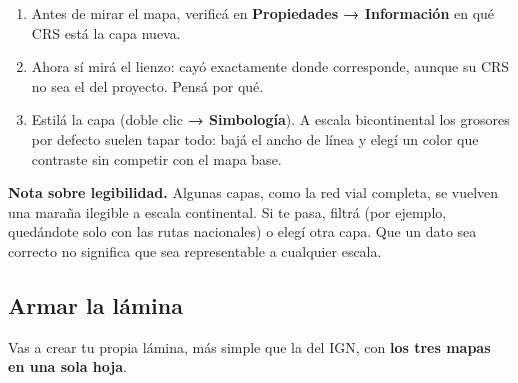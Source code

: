\documentclass{article}
\begin{document}
\begin{enumerate}
    \item Antes de mirar el mapa, verificá en \textbf{Propiedades → Información} en qué CRS está la capa nueva.
    \item Ahora sí mirá el lienzo: cayó exactamente donde corresponde, aunque su CRS no sea el del proyecto. Pensá por qué.
    \item Estilá la capa (doble clic \textbf{→ Simbología}). A escala bicontinental los grosores por defecto suelen tapar todo: bajá el ancho de línea y elegí un color que contraste sin competir con el mapa base.
\end{enumerate}

\textbf{Nota sobre legibilidad.} Algunas capas, como la red vial completa, se vuelven una maraña ilegible a escala continental. Si te pasa, filtrá (por ejemplo, quedándote solo con las rutas nacionales) o elegí otra capa. Que un dato sea correcto no significa que sea representable a cualquier escala.

\subsection{Armar la lámina}

Vas a crear tu propia lámina, más simple que la del IGN, con \textbf{los tres mapas en una sola hoja}.
\end{document}
